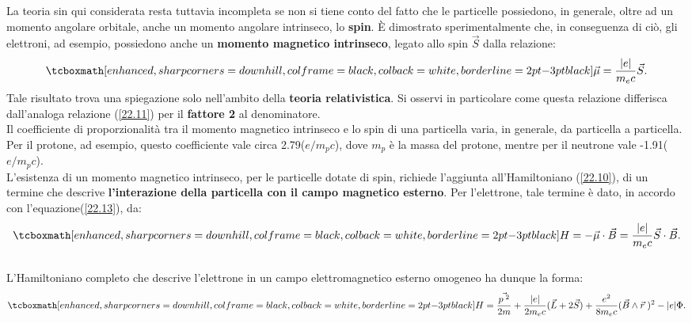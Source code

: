 La teoria sin qui considerata resta tuttavia incompleta se non si tiene conto del fatto che le particelle possiedono, in generale, oltre ad un momento angolare orbitale, anche un momento angolare intrinseco, lo \textbf{spin}. È dimostrato sperimentalmente che, in conseguenza di ciò, gli elettroni, ad esempio, possiedono anche un \textbf{momento magnetico intrinseco}, legato allo spin $\vec{S}$ dalla relazione:
	\begin{equation}
		\tcboxmath[enhanced, sharp corners=downhill, colframe=black, colback=white, borderline={2pt}{-3pt}{black}]{
			\vec{\mu}=\frac{|e|}{m_{e}c}\vec{S} .
			}
	\label{22.13}
	\end{equation}
Tale risultato trova una spiegazione solo nell'ambito della \textbf{teoria relativistica}. Si osservi in particolare come questa relazione differisca dall'analoga relazione (\ref{22.11}) per il \textbf{fattore 2} al denominatore.\\

Il coefficiente di proporzionalità tra il momento magnetico intrinseco e lo spin di una particella varia, in generale, da particella a particella. Per il protone, ad esempio, questo coefficiente vale circa 2.79($e/m_{p}c$), dove $m_{p}$ è la massa del protone, mentre per il neutrone vale -1.91($e/m_{p}c$).\\

L'esistenza di un momento magnetico intrinseco, per le particelle dotate di spin, richiede l'aggiunta all'Hamiltoniano (\ref{22.10}), di un termine che descrive \textbf{l'interazione della particella con il campo magnetico esterno}. Per l'elettrone, tale termine è dato, in accordo con l'equazione(\ref{22.13}), da:
	\begin{equation}
		\tcboxmath[enhanced, sharp corners=downhill, colframe=black, colback=white, borderline={2pt}{-3pt}{black}]{
			H=-\vec{\mu}\cdot\vec{B}=\frac{|e|}{m_{e}c}\vec{S}\cdot\vec{B} .
			}
	\end{equation}\\
	
L'Hamiltoniano completo che descrive l'elettrone in un campo elettromagnetico esterno omogeneo ha dunque la forma:
	\begin{equation}
		\tcboxmath[enhanced, sharp corners=downhill, colframe=black, colback=white, borderline={2pt}{-3pt}{black}]{
			H=\frac{\vec{p^{\;2}}}{2m}+\frac{|e|}{2m_{e}c}(\vec{L}+2\vec{S})+\frac{e^{2}}{8m_{e}c}(\vec{B}\wedge\vec{r}\;)^{2}-|e|\Phi .
			}
	\end{equation}
